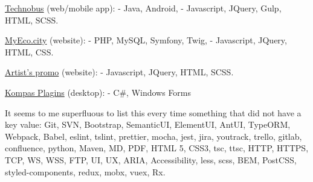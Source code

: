 \documentclass{yb}
\begin{document}
\href{https://nikitait.github.io/ru.returnonintelligence.technobus.front}{Technobus} (web/mobile app):
\newline - Java, Android,
\newline - Javascript, JQuery, Gulp, HTML, SCSS.

\href{https://github.com/HackSpb/eco-project}{MyEco.city} (website):
\newline - PHP, MySQL, Symfony, Twig,
\newline - Javascript, JQuery, HTML, CSS.

\href{https://nikitait.github.io/xDontStopMeNow/}{Artist's promo} (website):
\newline - Javascript, JQuery, HTML, SCSS.

\href{https://github.com/NikitaIT/Projects/tree/master/Kompas Delail Plagin C\%23}{Kompas Plagins} (desktop):
\newline - C\#, Windows Forms

It seems to me superfluous to list this every time something that did not have a key value: Git, SVN, Bootstrap, SemanticUI, ElementUI, AntUI, TypeORM, Webpack, Babel, eslint, tslint, prettier, mocha, jest, jira, youtrack, trello, gitlab, confluence, python, Maven, MD, PDF, HTML 5, CSS3, tsc, ttsc, HTTP, HTTPS, TCP, WS, WSS, FTP, UI, UX, ARIA, Accessibility, less, scss, BEM, PostCSS, styled-components, redux, mobx, vuex, Rx.
\end{document}
